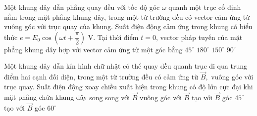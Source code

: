 \begin{vidu} %
	 Một khung dây dẫn phẳng quay đều với tốc độ góc $\omega $ quanh một trục cố định nằm trong mặt phẳng khung dây, trong một từ trường đều có vector cảm ứng từ vuông góc với trục quay của khung. Suất điện động cảm ứng trong khung có biểu thức $e=E_{0}\cos (\omega t+\dfrac{\pi }{2})$ V. Tại thời điểm $t = 0$, vector pháp tuyến của mặt phẳng khung dây hợp với vector cảm ứng từ một góc bằng
	\choice
	{$45^\circ$}
	{\True $180^\circ$}
	{$150^\circ$}
	{$90^\circ$}
\end{vidu}
\begin{vidu}%
	Một khung dây dẫn kín hình chữ nhật có thể quay đều quanh trục đi qua trung điểm hai cạnh đối diện, trong một từ trường đều có cảm ứng từ $\vec{B},$ vuông góc với trục quay. Suất điện động xoay chiều xuất hiện trong khung có độ lớn cực đại khi mặt phẳng chứa khung dây
	\choice
	{\True song song với $\vec{B}$}
	{vuông góc với $\vec{B}$}
	{tạo với $\vec{B}$ góc $45^\circ$}
	{tạo với $\vec{B}$ góc $60^\circ$}
\end{vidu}
